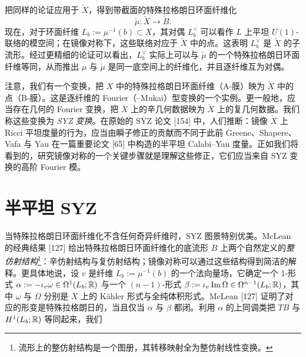 把同样的论证应用于 $\check X$，得到带截面的特殊拉格朗日环面纤维化
\[
  \check\mu : \check X \to \check B .
\]
现在，对于环面纤维 $L_b := \mu^{-1}(b) \subset X$，其对偶 $L_b^\vee$ 可以看作 $L$ 上平坦 $U(1)$-联络的模空间；在镜像对称下，这些联络对应于 $\check X$ 中的点。这表明 $L_b^\vee$ 是 $\check X$ 的子流形。经过更精细的论证可以看出，$L_b^\vee$ 实际上可以与 $\check\mu$ 的一个特殊拉格朗日环面纤维等同，从而推出 $\mu$ 与 $\check\mu$ 是同一底空间上的纤维化，并且逐纤维互为对偶。

注意，我们有一个变换，把 $X$ 中的特殊拉格朗日环面纤维（A-膜）映为 $\check X$ 中的点（B-膜）。这是逐纤维的 Fourier（--Mukai）型变换的一个实例。更一般地，应当存在几何的 Fourier 变换，把 $X$ 上的辛几何数据映为 $\check X$ 上的复几何数据。我们称这些变换为 \emph{SYZ 变换}。在原始的 SYZ 论文 [154] 中，人们推断：镜像 $\check X$ 上 Ricci 平坦度量的行为，应当由瞬子修正的贡献而不同于此前 Greene、Shapere、Vafa 与 Yau 在一篇重要论文 [65] 中构造的半平坦 Calabi--Yau 度量。正如我们将看到的，研究镜像对称的一个关键步骤就是理解这些修正，它们应当来自 SYZ 变换的高阶 Fourier 模。

\section{半平坦 SYZ}
当特殊拉格朗日环面纤维化不含任何奇异纤维时，SYZ 图景特别优美。McLean 的经典结果 [127] 给出特殊拉格朗日环面纤维化的底流形 $B$ 上两个自然定义的\emph{整仿射结构}\footnote{流形上的整仿射结构是一个图册，其转移映射全为整仿射线性变换。}：辛仿射结构与复仿射结构；镜像对称可以通过这些结构得到简洁的解释。更具体地说，设 $v$ 是纤维 $L_b := \mu^{-1}(b)$ 的一个法向量场，它确定一个 1-形式 $\alpha := -\iota_v \omega \in \Omega^1(L_b;\mathbb{R})$ 与一个 $(n-1)$-形式 $\beta := \iota_v \operatorname{Im}\Omega \in \Omega^{n-1}(L_b;\mathbb{R})$，其中 $\omega$ 与 $\Omega$ 分别是 $X$ 上的 K\"ahler 形式与全纯体积形式。McLean [127] 证明了对应的形变是特殊拉格朗日的，当且仅当 $\alpha$ 与 $\beta$ 都闭。利用 $\alpha$ 的上同调类把 $TB$ 与 $H^1(L_b;\mathbb{R})$ 等同起来，我们

